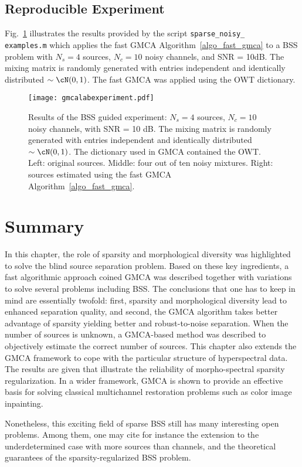\subsection{Reproducible Experiment}
Fig.~\ref{fig:gmcalabexperiment} illustrates the results provided by the script {\tt sparse\_noisy\_\\examples.m} which applies the fast GMCA Algorithm~\ref{algo_fast_gmca} to a BSS problem with $N_s=4$ sources, $N_c=10$ noisy channels, and SNR = 10dB. The mixing matrix is randomly generated with entries independent and identically distributed $\sim \cN(0,1)$. The fast GMCA was applied using the OWT dictionary.
 
\begin{figure}[htb]
\centerline{\texttt{[image: gmcalabexperiment.pdf]}}
\caption{Results of the BSS guided experiment: $N_s=4$ sources, $N_c=10$ noisy channels, with SNR = 10 dB. The mixing matrix is randomly generated with entries independent and identically distributed $\sim \cN(0,1)$. The dictionary used in GMCA contained the OWT. Left: original sources. Middle: four out of ten noisy mixtures. Right: sources estimated using the fast GMCA Algorithm~\ref{algo_fast_gmca}.} 
\label{fig:gmcalabexperiment}
\end{figure} 

\section{Summary}
In this chapter, the role of sparsity and morphological diversity was highlighted to solve the blind source separation problem. Based on these key ingredients, a fast algorithmic approach coined GMCA was described together with variations to solve several problems including BSS. The conclusions that one has to keep in mind are essentially twofold: first, sparsity and morphological diversity lead to enhanced separation quality, and second, the GMCA algorithm takes better advantage of sparsity yielding better and robust-to-noise separation. When the number of sources is unknown, a GMCA-based method was described to objectively estimate the correct number of sources. This chapter also extends the GMCA framework to cope with the particular structure of hyperspectral data. The results are given that illustrate the reliability of morpho-spectral sparsity regularization. In a wider framework, GMCA is shown to provide an effective basis for solving classical multichannel restoration problems such as color image inpainting. 

Nonetheless, this exciting field of sparse BSS still has many interesting open problems. Among them, one may cite for instance the extension to the underdetermined case with more sources than channels, and the theoretical guarantees of the sparsity-regularized BSS problem. 
